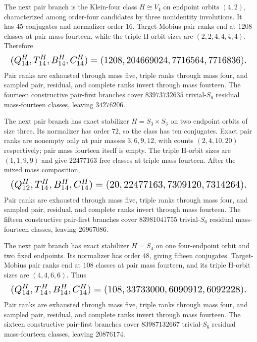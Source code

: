 \documentclass{article}
\newcommand{\fitmath}[1]{\resizebox{0.99\linewidth}{!}{$\displaystyle #1$}}
\begin{document}
The next pair branch is the Klein-four class $H\cong V_4$ on endpoint orbits
$(4,2)$, characterized among order-four candidates by three nonidentity
involutions. It has $45$ conjugates and normalizer order $16$. Target-Mobius
pair ranks end at $1208$ classes at pair mass fourteen, while the triple H-orbit
sizes are $(2,2,4,4,4,4)$. Therefore
\begin{equation}
  \fitmath{%
    (Q^H_{14},T^H_{14},B^H_{14},C^H_{14})
      =(1208,204669024,7716564,7716836).
  }
  \label{eq:optimization-crazy-sextuple-s6-pair-v4-42-ranking}
\end{equation}
Pair ranks are exhausted through mass five, triple ranks through mass four, and
sampled pair, residual, and complete ranks invert through mass fourteen. The
fourteen constructive pair-first branches cover $83973732635$ trivial-$S_6$
residual mass-fourteen classes, leaving $34276206$.

The next pair branch has exact stabilizer $H=S_3\times S_3$ on two endpoint
orbits of size three. Its normalizer has order $72$, so the class has ten
conjugates. Exact pair ranks are nonempty only at pair masses $3,6,9,12$, with
counts $(2,4,10,20)$ respectively; pair mass fourteen itself is empty. The
triple H-orbit sizes are $(1,1,9,9)$ and give $22477163$ free classes at triple
mass fourteen. After the mixed mass composition,
\begin{equation}
  \fitmath{%
    (Q^H_{12},T^H_{14},B^H_{14},C^H_{14})
      =(20,22477163,7309120,7314264).
  }
  \label{eq:optimization-crazy-sextuple-s6-pair-s3-times-s3-ranking}
\end{equation}
Pair ranks are exhausted through mass five, triple ranks through mass four, and
sampled pair, residual, and complete ranks invert through mass fourteen. The
fifteen constructive pair-first branches cover $83981041755$ trivial-$S_6$
residual mass-fourteen classes, leaving $26967086$.

The next pair branch has exact stabilizer $H=S_4$ on one four-endpoint orbit
and two fixed endpoints. Its normalizer has order $48$, giving fifteen
conjugates. Target-Mobius pair ranks end at $108$ classes at pair mass fourteen,
and its triple H-orbit sizes are $(4,4,6,6)$. Thus
\begin{equation}
  \fitmath{%
    (Q^H_{14},T^H_{14},B^H_{14},C^H_{14})
      =(108,33733000,6090912,6092228).
  }
  \label{eq:optimization-crazy-sextuple-s6-pair-s4-411-ranking}
\end{equation}
Pair ranks are exhausted through mass five, triple ranks through mass four, and
sampled pair, residual, and complete ranks invert through mass fourteen. The
sixteen constructive pair-first branches cover $83987132667$ trivial-$S_6$
residual mass-fourteen classes, leaving $20876174$.
\end{document}
